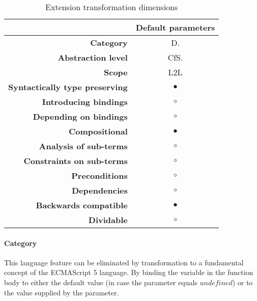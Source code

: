 \begin{table}[h]
\centering
\caption{Extension transformation dimensions}
\label{default-parameter-table}
\begin{tabular}{@{}rc@{}}
\toprule
                                       & \multicolumn{1}{l}{\textbf{Default parameters}} \\ \midrule
\textbf{Category}                      & D.
\\
\textbf{Abstraction level}          & CfS.                          \\
\textbf{Scope}                         & L2L                               \\
\textbf{Syntactically type preserving} & $\bullet$                                          \\
\textbf{Introducing bindings}          & $\circ$                                          \\%
\textbf{Depending on bindings}         & $\circ$                                           \\
\textbf{Compositional}                 & $\bullet$                                          \\
\textbf{Analysis of sub-terms}          & $\circ$                                          \\
\textbf{Constraints on sub-terms}       & $\circ$                                           \\
\textbf{Preconditions}                 & $\circ$                                          \\
\textbf{Dependencies}                  & $\circ$                                           \\
\textbf{Backwards compatible}          & $\bullet$                                          \\
\textbf{Dividable}                     & $\circ$                                           \\ \bottomrule
\end{tabular}
\end{table}

\paragraph{Category}
This language feature can be eliminated by transformation to a fundamental concept of the ECMAScript 5 language. By binding the variable in the function body to either the default value (in case the parameter equals $undefined$) or to the value supplied by the parameter.

